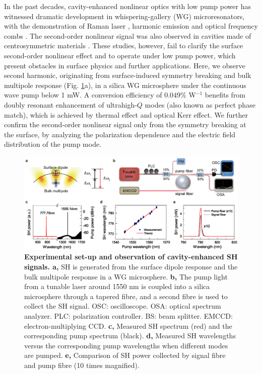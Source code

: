 \documentclass[a4paper,8pt,hyperref, twocolumn, aps, prl]{article}
\begin{document}
In the past decades, cavity-enhanced nonlinear optics with low pump power has witnessed dramatic development in whispering-gallery (WG) microresonators, with the demonstration of Raman laser \cite{spillane2002ultralow}, harmonic emission \cite{ilchenko2004nonlinear, carmon2007visible, furst2010naturally} and optical frequency combs \cite{del2007optical}. 
The second-order nonlinear signal was also observed
in cavities made of centrosymmetric materials \cite{gouveia2013second, lettieri2002second, lettieri2005second, levy2011harmonic, asano2016visible, xue2017second}.
These studies, however, fail to clarify the surface second-order nonlinear effect and to operate under low pump power, which present obstacles in surface physics and further applications.
Here, we observe second harmonic, originating from surface-induced symmetry breaking and bulk multipole response (Fig. \ref{pic:Fig1}a), in a silica WG microsphere under the continuous wave pump below 1 mW. 
A conversion efficiency of $0.049\%$ W$^{-1}$ benefits from doubly resonant enhancement of ultrahigh-$Q$ modes (also known as perfect phase match), which is achieved by thermal effect and optical Kerr effect. 
We further confirm the second-order nonlinear signal only from the symmetry breaking at the surface, by analyzing the polarization dependence and the electric field distribution of the pump mode. 

\begin{figure}[!ht]
\centering
\includegraphics[width=18cm]{Fig1.eps}
\caption{\textbf{Experimental set-up and observation of cavity-enhanced SH signals. a, }SH is generated from the surface dipole response and the bulk multipole response in a WG microsphere. \textbf{b, }The pump light from a tunable laser around 1550 nm is coupled into a silica microsphere through a tapered fibre, and a second fibre is used to collect the SH signal. OSC: oscilloscope. OSA: optical spectrum analyzer. PLC: polarization controller. BS: beam splitter. EMCCD: electron-multiplying CCD. \textbf{c, }Measured SH spectrum (red) and the corresponding pump spectrum (black). \textbf{d, }Measured SH wavelengths versus the corresponding pump wavelengths when different modes are pumped. \textbf{e, }Comparison of SH power collected by signal fibre and pump fibre (10 times magnified).}
\label{pic:Fig1}
\end{figure}
\end{document}
